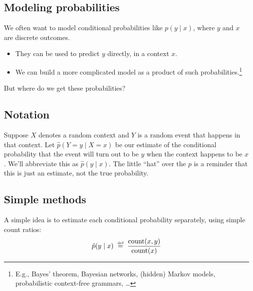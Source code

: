 \documentclass[11pt]{article}
\newcommand{\defeq}{\;\stackrel{\mbox{\tiny def}}{=}\;}
\newcommand{\ph}{\hat{p}}
\begin{document}
\subsection{Modeling probabilities}

We often want to model conditional probabilities like $p(y
\mid x)$, where $y$ and $x$ are discrete outcomes.
\begin{itemize}[noitemsep]
\item They can be used to predict $y$ directly, in a context $x$.
\item We can build a more complicated model as a product
  of such probabilities.\footnote{E.g., Bayes' theorem, Bayesian
    networks, (hidden) Markov models, probabilistic context-free
    grammars, \ldots}
\end{itemize}
But where do we get these probabilities?

\subsection{Notation}\label{sec:notation}

Suppose $X$ denotes a random context and $Y$ is a random event that
happens in that context.  Let $\ph(Y=y \mid X=x)$ be our estimate of
the conditional probability that the event will turn out to be $y$ when
the context happens to be $x$.  We'll abbreviate this as
$\ph(y\mid x)$.  The little ``hat'' over the $p$ is a reminder that
this is just an estimate, not the true probability.

\subsection{Simple methods}\label{sec:mle}

A simple idea is to estimate each conditional probability separately,
using simple count ratios:
\begin{equation}
\ph(y \mid x) \defeq \frac{\textrm{count}(x,y)}{\textrm{count}(x)}
\end{equation}
\end{document}
